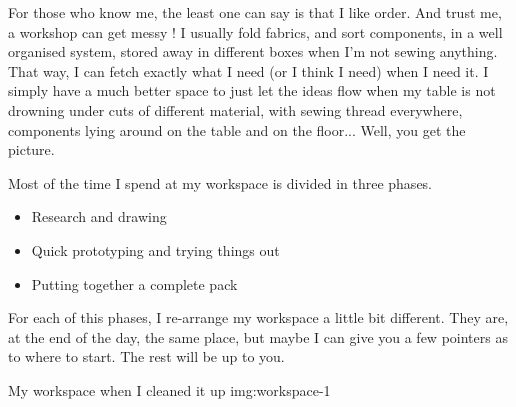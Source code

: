 For those who know me, the least one can say is that I like order. And trust me, a workshop can get messy ! I usually fold fabrics, and sort components, in a well organised system, stored away in different boxes when I’m not sewing anything. That way, I can fetch exactly what I need (or I think I need) when I need it. I simply have a much better space to just let the ideas flow when my table is not drowning under cuts of different material, with sewing thread everywhere, components lying around on the table and on the floor... Well, you get the picture.

Most of the time I spend at my workspace is divided in three phases.

\begin{itemize}

  \item Research and drawing
  \item Quick prototyping and trying things out
  \item Putting together a complete pack

\end{itemize}

For each of this phases, I re-arrange my workspace a little bit different. They are, at the end of the day, the same place, but maybe I can give you a few pointers as to where to start. The rest will be up to you.

{My workspace when I cleaned it up}
{img:workspace-1}
